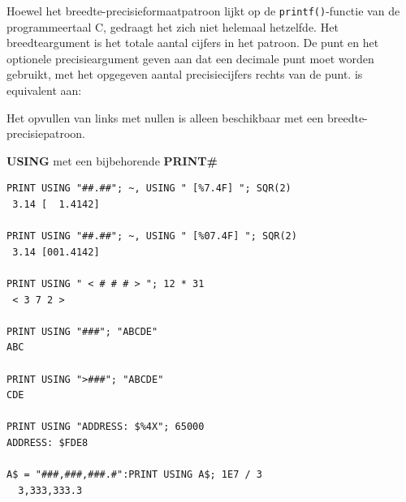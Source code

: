 \begin{description}[leftmargin=2cm,style=nextline]
                  Hoewel het breedte-precisieformaatpatroon lijkt op de \texttt{printf()}-functie van de programmeertaal C, gedraagt het zich niet helemaal hetzelfde. Het breedteargument is het totale aantal cijfers in het patroon. De punt en het optionele precisieargument geven aan dat een decimale punt moet worden gebruikt, met het opgegeven aantal precisiecijfers rechts van de punt.  is equivalent aan: 

                  Het opvullen van links met nullen is alleen beschikbaar met een breedte-precisiepatroon.

\item [Voorbeelden:] {\bf USING} met een bijbehorende {\bf PRINT\#}

\begin{tcolorbox}[colback=black,coltext=white]
\verbatimfont{\codefont}
\begin{verbatim}
PRINT USING "##.##"; ~, USING " [%7.4F] "; SQR(2)
 3.14 [  1.4142]

PRINT USING "##.##"; ~, USING " [%07.4F] "; SQR(2)
 3.14 [001.4142]

PRINT USING " < # # # > "; 12 * 31
 < 3 7 2 >

PRINT USING "###"; "ABCDE"
ABC

PRINT USING ">###"; "ABCDE"
CDE

PRINT USING "ADDRESS: $%4X"; 65000
ADDRESS: $FDE8

A$ = "###,###,###.#":PRINT USING A$; 1E7 / 3
  3,333,333.3
\end{verbatim}
\end{tcolorbox}
\end{description}


\newpage
